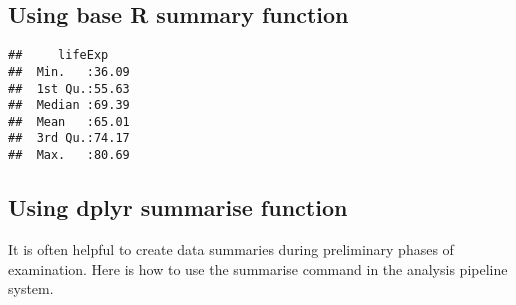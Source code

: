 \documentclass[
]{book}
\newenvironment{Shaded}{\begin{snugshade}}{\end{snugshade}}
\newcommand{\DataTypeTok}[1]{\textcolor[rgb]{0.13,0.29,0.53}{#1}}
\newcommand{\DecValTok}[1]{\textcolor[rgb]{0.00,0.00,0.81}{#1}}
\newcommand{\FloatTok}[1]{\textcolor[rgb]{0.00,0.00,0.81}{#1}}
\newcommand{\KeywordTok}[1]{\textcolor[rgb]{0.13,0.29,0.53}{\textbf{#1}}}
\newcommand{\NormalTok}[1]{#1}
\newcommand{\OperatorTok}[1]{\textcolor[rgb]{0.81,0.36,0.00}{\textbf{#1}}}
\newcommand{\OtherTok}[1]{\textcolor[rgb]{0.56,0.35,0.01}{#1}}
\newcommand{\StringTok}[1]{\textcolor[rgb]{0.31,0.60,0.02}{#1}}
\begin{document}
\hypertarget{using-base-r-summary-function}{%
\subsection{Using base R summary function}\label{using-base-r-summary-function}}

\begin{Shaded}
\end{Shaded}

\begin{verbatim}
##     lifeExp     
##  Min.   :36.09  
##  1st Qu.:55.63  
##  Median :69.39  
##  Mean   :65.01  
##  3rd Qu.:74.17  
##  Max.   :80.69
\end{verbatim}

\hypertarget{using-dplyr-summarise-function}{%
\subsection{Using dplyr summarise function}\label{using-dplyr-summarise-function}}

It is often helpful to create data summaries during preliminary phases of examination. Here is how to use the summarise command in the analysis pipeline system.

\begin{Shaded}
\end{Shaded}
\end{document}
